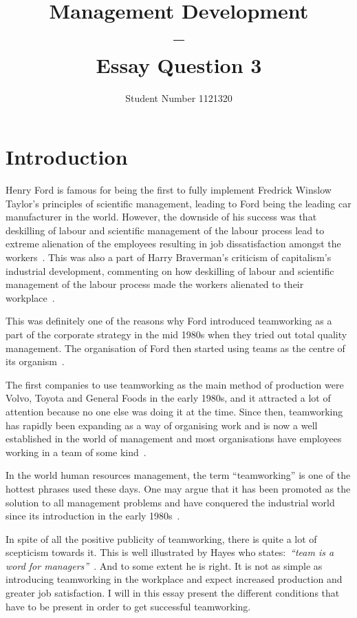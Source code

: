 \documentclass[a4paper,12pt,titlepage]{article}
\title{Management Development \\ -- \\Essay Question 3}
\author{Student Number 1121320}
\begin{document}
  \setlength{\baselineskip}{2em}
  \maketitle
  
  \section{Introduction}
  Henry Ford is famous for being the first to
  fully implement Fredrick Winslow Taylor's principles of
  scientific management, leading to Ford being the leading car
  manufacturer in the world. However, the downside of his success
  was that deskilling of labour and scientific management
  of the labour process lead to extreme alienation of the employees
  resulting in job dissatisfaction amongst the workers~\cite{hbe}.
  This was also a part of Harry Braverman's criticism of
  capitalism's industrial development, commenting on how deskilling of 
  labour and scientific management of the labour process made the workers
  alienated to their workplace~\cite{hb}.
  
  This was definitely one of the reasons
  why Ford introduced teamworking as a part of the corporate strategy
  in the mid 1980s when they tried out total quality management. 
  The organisation of Ford then started using teams as the centre of
  its organism~\cite[115]{sr}.

  The first companies to use teamworking
  as the main method of production were Volvo, Toyota and
  General Foods in the early 1980s,
  and it attracted a lot of attention because no one
  else was doing it at the time. Since then, teamworking has 
  rapidly been expanding as a way of organising work and is now a well
  established in the world of management and most organisations have
  employees working in a team of some kind~\cite[284]{sr}.

  In the world human resources management, the term 
  ``teamworking'' is one of the hottest phrases used these days.
  One may argue that it
  has been promoted as the solution to all management problems and
  have conquered the industrial world since its introduction in the
  early 1980s~\cite[623]{ahdb}.

  In spite of all the positive publicity of teamworking,
  there is quite a lot of scepticism towards it. This is
  well illustrated by Hayes who
  states:~\emph{``team is a word for managers''}~\cite[374]{ahdb}.
  And to some extent he is right. It is not as simple as
  introducing teamworking in the workplace and expect increased production
  and greater job satisfaction. I will in this essay
  present the different conditions that
  have to be present in order to get successful teamworking.
  
\end{document}
